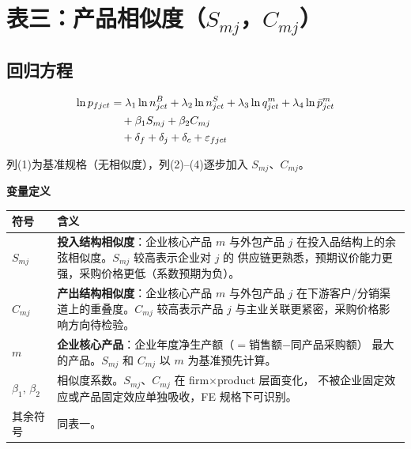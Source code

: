\documentclass[12pt]{article}
\begin{document}
\section*{表三：产品相似度（$S_{mj}$，$C_{mj}$）}

\subsection*{回归方程}

\begin{align}
  \ln p_{fjct}
    &= \lambda_1\ln n^{B}_{jct}
     + \lambda_2\ln n^{S}_{jct}
     + \lambda_3\ln q^{m}_{jct}
     + \lambda_4\ln\bar{p}^{m}_{jct} \notag\\
    &\quad + \beta_1 S_{mj} + \beta_2 C_{mj} \notag\\
    &\quad + \delta_{f} + \delta_{j} + \delta_{c} + \varepsilon_{fjct}
  \label{eq:similarity}
\end{align}

\noindent 列(1)为基准规格（无相似度），列(2)--(4)逐步加入 $S_{mj}$、$C_{mj}$。

\medskip
\noindent\textbf{变量定义}

\smallskip
{\small
\begin{tabular}{@{} L{3.5cm} L{10.5cm} @{}}
\toprule
符号 & 含义 \\
\midrule
$S_{mj}$ &
  \textbf{投入结构相似度}：企业核心产品 $m$ 与外包产品 $j$
  在投入品结构上的余弦相似度。$S_{mj}$ 较高表示企业对 $j$ 的
  供应链更熟悉，预期议价能力更强，采购价格更低（系数预期为负）。\\[4pt]
$C_{mj}$ &
  \textbf{产出结构相似度}：企业核心产品 $m$ 与外包产品 $j$
  在下游客户/分销渠道上的重叠度。$C_{mj}$ 较高表示产品 $j$
  与主业关联更紧密，采购价格影响方向待检验。\\[4pt]
$m$ &
  \textbf{企业核心产品}：企业年度净生产额（$=$销售额$-$同产品采购额）
  最大的产品。$S_{mj}$ 和 $C_{mj}$ 以 $m$ 为基准预先计算。\\[4pt]
$\beta_1,\,\beta_2$ &
  相似度系数。$S_{mj}$、$C_{mj}$ 在 firm$\times$product 层面变化，
  不被企业固定效应或产品固定效应单独吸收，FE 规格下可识别。\\[4pt]
其余符号 & 同表一。\\
\bottomrule
\end{tabular}
}

\vspace{8pt}
\end{document}
